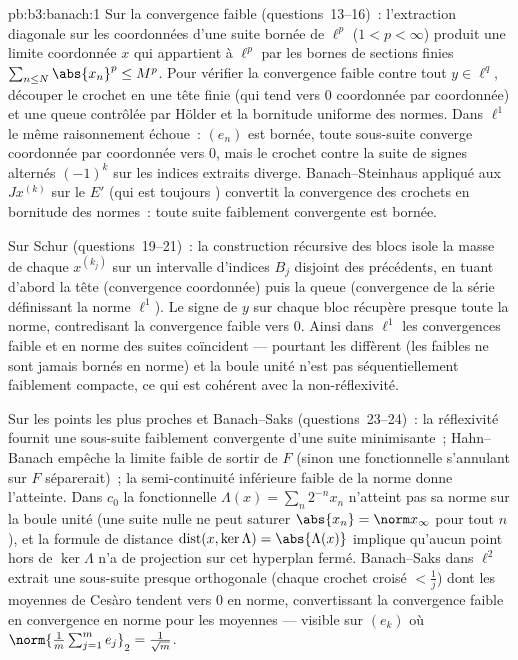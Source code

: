 \begin{solution}{pb:b3:banach:1}
Sur la convergence faible (questions~13--16)~: l'extraction
diagonale sur les coordonnées d'une suite bornée de $\ell^p$
($1 < p < \infty$) produit une limite coordonnée $x$ qui
appartient à $\ell^p$ par les bornes de sections finies
$\sum_{n\leq N}\abs{x_n}^p \leq M^p$. Pour vérifier la
convergence faible contre tout $y \in \ell^q$, découper le
crochet en une tête finie (qui tend vers $0$ coordonnée par
coordonnée) et une queue contrôlée par Hölder et la
bornitude uniforme des normes. Dans $\ell^1$ le même
raisonnement échoue~: $(e_n)$ est bornée, toute sous-suite
converge coordonnée par coordonnée vers $0$, mais le crochet
contre la suite de signes alternés $(-1)^k$ sur les indices
extraits diverge. Banach--Steinhaus appliqué aux $J
x^{(k)}$ sur le  $E'$ (qui est toujours ) convertit
la convergence des crochets en bornitude des normes~: toute
suite faiblement convergente est bornée.

Sur Schur (questions~19--21)~: la construction récursive des
blocs isole la masse de chaque $x^{(k_j)}$ sur un intervalle
d'indices $B_j$ disjoint des précédents, en tuant d'abord la
tête (convergence coordonnée) puis la queue (convergence de
la série définissant la norme $\ell^1$). Le signe de $y$ sur
chaque bloc récupère presque toute la norme, contredisant la
convergence faible vers $0$. Ainsi dans $\ell^1$ les
convergences faible et en norme des suites coïncident ---
pourtant les  diffèrent (les  faibles ne
sont jamais bornés en norme) et la boule unité n'est pas
séquentiellement faiblement compacte, ce qui est cohérent avec
la non-réflexivité.

Sur les points les plus proches et Banach--Saks
(questions~23--24)~: la réflexivité fournit une sous-suite
faiblement convergente d'une suite minimisante~; Hahn--Banach
empêche la limite faible de sortir de $F$ (sinon une
fonctionnelle s'annulant sur $F$ séparerait)~; la
semi-continuité inférieure faible de la norme donne
l'atteinte. Dans $c_0$ la fonctionnelle $\Lambda(x) =
\sum_n 2^{-n}x_n$ n'atteint pas sa norme sur la boule unité
(une suite nulle ne peut saturer $\abs{x_n} = \norm
x_\infty$ pour tout $n$), et la formule de distance
$\operatorname{dist}(x, \ker\Lambda) = \abs{\Lambda(x)}$
implique qu'aucun point hors de $\ker\Lambda$ n'a de
projection sur cet hyperplan fermé. Banach--Saks dans
$\ell^2$ extrait une sous-suite presque orthogonale (chaque
crochet croisé $< \frac1j$) dont les moyennes de Cesàro
tendent vers $0$ en norme, convertissant la convergence
faible en convergence en norme pour les moyennes --- visible
sur $(e_k)$ où $\norm{\frac1m\sum_{j=1}^m e_j}_2 =
\frac1{\sqrt m}$.


\end{solution}
